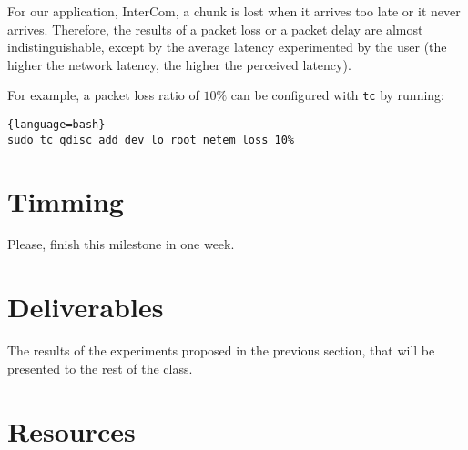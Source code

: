 For our application, InterCom, a chunk is lost when it arrives too
late or it never arrives. Therefore, the results of a packet loss or a
packet delay are almost indistinguishable, except by the average
latency experimented by the user (the higher the network latency, the
higher the perceived latency).

For example, a packet loss ratio of $10\%$ can be configured with
\verb|tc| by running:

  \begin{lstlisting}{language=bash}
sudo tc qdisc add dev lo root netem loss 10%
  \end{lstlisting}

\section{Timming}

Please, finish this milestone in one week.

\section{Deliverables}

The results of the experiments proposed in the previous section, that
will be presented to the rest of the class.

\section{Resources}


